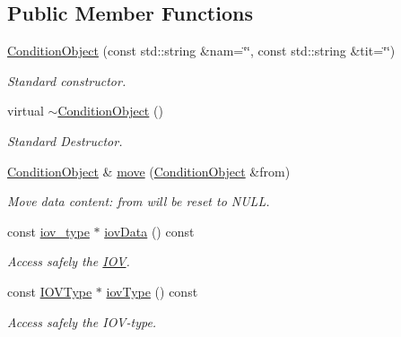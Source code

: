 \subsection*{Public Member Functions}
\begin{DoxyCompactItemize}
\item 
\hyperlink{class_d_d4hep_1_1_conditions_1_1_interna_1_1_condition_object_af7f5469b66f682e5798d5a7168c16cea}{Condition\+Object} (const std\+::string \&nam=\char`\"{}\char`\"{}, const std\+::string \&tit=\char`\"{}\char`\"{})
\begin{DoxyCompactList}\small\item\em Standard constructor. \end{DoxyCompactList}\item 
virtual \hyperlink{class_d_d4hep_1_1_conditions_1_1_interna_1_1_condition_object_a37f67e8fcbbb726ba44d7f043ec5bcdf}{$\sim$\+Condition\+Object} ()
\begin{DoxyCompactList}\small\item\em Standard Destructor. \end{DoxyCompactList}\item 
\hyperlink{class_d_d4hep_1_1_conditions_1_1_interna_1_1_condition_object}{Condition\+Object} \& \hyperlink{class_d_d4hep_1_1_conditions_1_1_interna_1_1_condition_object_a2d944a3507299b38f69c5bd8b66494a5}{move} (\hyperlink{class_d_d4hep_1_1_conditions_1_1_interna_1_1_condition_object}{Condition\+Object} \&from)
\begin{DoxyCompactList}\small\item\em Move data content\+: \textquotesingle{}from\textquotesingle{} will be reset to N\+U\+LL. \end{DoxyCompactList}\item 
const \hyperlink{class_d_d4hep_1_1_conditions_1_1_interna_1_1_condition_object_a6d54716450a73a1a439ca06445f56d24}{iov\+\_\+type} $\ast$ \hyperlink{class_d_d4hep_1_1_conditions_1_1_interna_1_1_condition_object_a7d71b92cf668d0f5a9ad17e0895b0e5f}{iov\+Data} () const
\begin{DoxyCompactList}\small\item\em Access safely the \hyperlink{class_d_d4hep_1_1_i_o_v}{I\+OV}. \end{DoxyCompactList}\item 
const \hyperlink{class_d_d4hep_1_1_i_o_v_type}{I\+O\+V\+Type} $\ast$ \hyperlink{class_d_d4hep_1_1_conditions_1_1_interna_1_1_condition_object_aebf1262e5b6ee98acedc8a6481a826ba}{iov\+Type} () const
\begin{DoxyCompactList}\small\item\em Access safely the I\+O\+V-\/type. \end{DoxyCompactList}\item 

\end{DoxyCompactItemize}
